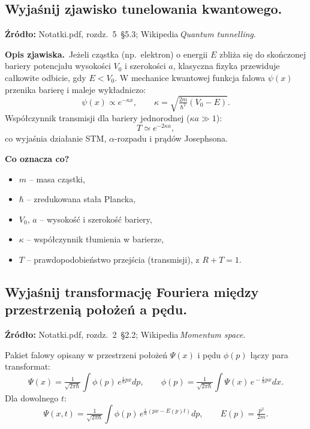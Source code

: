\subsection{Wyjaśnij zjawisko tunelowania kwantowego.}

\textbf{Źródło:} Notatki.pdf, rozdz.~5~\S5.3; Wikipedia\,\emph{Quantum tunnelling}.
		
		\vspace{4pt}
		\textbf{Opis zjawiska.}\  
		Jeżeli cząstka (np.~elektron) o energii $E$ zbliża się do skończonej bariery
		potencjału wysokości $V_0$ i szerokości $a$, klasyczna fizyka
		przewiduje całkowite odbicie, gdy $E<V_0$.
		W mechanice kwantowej funkcja falowa $\psi(x)$ przenika barierę i maleje
		wykładniczo:
		\[
		\psi(x)\propto e^{-\kappa x},\qquad \kappa=\sqrt{\tfrac{2m}{\hbar^{2}}(V_0-E)}.
		\]
		Współczynnik transmisji dla bariery jednorodnej ($\kappa a\gg1$):
		\[
		T\simeq e^{-2\kappa a},
		\]
		co wyjaśnia działanie STM, $\alpha$-rozpadu i prądów Josephsona.
		
		\vspace{4pt}
		\textbf{Co oznacza co?}
		\begin{itemize}
			\item $m$ – masa cząstki,
			\item $\hbar$ – zredukowana stała Plancka,
			\item $V_0$, $a$ – wysokość i szerokość bariery,
			\item $\kappa$ – współczynnik tłumienia w barierze,
			\item $T$ – prawdopodobieństwo przejścia (transmisji), z $R+T=1$.
		\end{itemize}

\subsection{Wyjaśnij transformację Fouriera między przestrzenią położeń a pędu.}

\textbf{Źródło:} Notatki.pdf, rozdz.~2~\S2.2; Wikipedia\,\emph{Momentum space}.
		
		Pakiet falowy opisany w przestrzeni położeń $\Psi(x)$ i pędu $\phi(p)$ łączy
		para transformat:
		\[
		\boxed{\Psi(x)=\tfrac{1}{\sqrt{2\pi\hbar}}\!\int\!\phi(p)\,e^{\tfrac{i}{\hbar}px}dp},\qquad
		\boxed{\phi(p)=\tfrac{1}{\sqrt{2\pi\hbar}}\!\int\!\Psi(x)\,e^{\! -\tfrac{i}{\hbar}px}dx}.
		\]
		Dla dowolnego $t$:
		\[
		\Psi(x,t)=\tfrac{1}{\sqrt{2\pi\hbar}}\!\int\!\phi(p)\,e^{\tfrac{i}{\hbar}(px-E(p)t)}dp,\qquad E(p)=\tfrac{p^{2}}{2m}.
		\]
		
